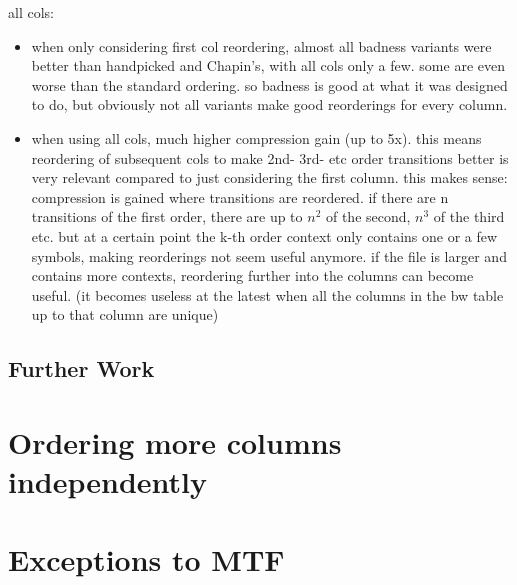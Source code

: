 \documentclass[a4paper]{scrreprt}
\begin{document}
all cols:
\begin{itemize}
  \item when only considering first col reordering, almost all badness variants
  were better than handpicked and Chapin's, with all cols only a few. some are
  even worse than the standard ordering. so badness is good at what it was
  designed to do, but obviously not all variants make good reorderings for every
  column.
  \item when using all cols, much higher compression gain (up to 5x). this means
  reordering of subsequent cols to make 2nd- 3rd- etc order transitions better
  is very relevant compared to just considering the first column. this makes
  sense: compression is gained where transitions are reordered. if there are n
  transitions of the first order, there are up to \(n^2\) of the second, \(n^3\)
  of the third etc. but at a certain point the k-th order context only contains
  one or a few symbols, making reorderings not seem useful anymore. if the file
  is larger and contains more contexts, reordering further into the columns can
  become useful. (it becomes useless at the latest when all the columns in the
  bw table up to that column are unique)
\end{itemize}


\section{Further Work}


\chapter{Ordering more columns independently}


\chapter{Exceptions to MTF}
\end{document}
